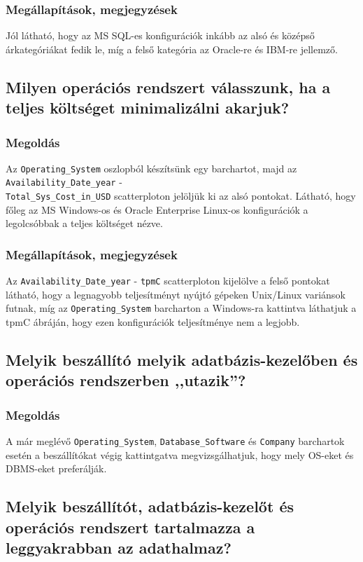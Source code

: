 \documentclass[a4paper,10pt,titlepage]{article}
\begin{document}
\subsubsection*{Megállapítások, megjegyzések}
Jól látható, hogy az MS SQL-es konfigurációk inkább az alsó és középső árkategóriákat fedik le, míg a felső kategória az Oracle-re és IBM-re jellemző.

\subsection{Milyen operációs rendszert válasszunk, ha a teljes költséget minimalizálni akarjuk?}
\subsubsection*{Megoldás}
Az \texttt{Operating\_System} oszlopból készítsünk egy barchartot, majd az \texttt{Availability\_Date\_year} - \\ \texttt{Total\_Sys\_Cost\_in\_USD} scatterploton jelöljük ki az alsó pontokat. Látható, hogy főleg az MS Windows-os és Oracle Enterprise Linux-os konfigurációk a legolcsóbbak a teljes költséget nézve.
\subsubsection*{Megállapítások, megjegyzések}
Az \texttt{Availability\_Date\_year} - \texttt{tpmC} scatterploton kijelölve a felső pontokat látható, hogy a legnagyobb teljesítményt nyújtó gépeken Unix/Linux variánsok futnak, míg az \texttt{Operating\_System} barcharton a Windows-ra kattintva láthatjuk a tpmC ábráján, hogy ezen konfigurációk teljesítménye nem a legjobb.

\subsection{Melyik beszállító melyik adatbázis-kezelőben és operációs rendszerben ,,utazik''?}
\subsubsection*{Megoldás}
A már meglévő \texttt{Operating\_System}, \texttt{Database\_Software} és \texttt{Company} barchartok esetén a beszállítókat végig kattintgatva megvizsgálhatjuk, hogy mely OS-eket és DBMS-eket preferálják.

\subsection{Melyik beszállítót, adatbázis-kezelőt és operációs rendszert tartalmazza a leggyakrabban az adathalmaz?}
\end{document}
